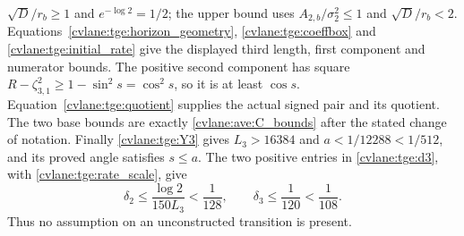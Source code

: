 $\sqrt D/r_b\geq1$ and $e^{-\log2}=1/2$; the upper bound uses
$A_{2,b}/\sigma_2^2\leq1$ and $\sqrt D/r_b<2$.
Equations~\eqref{cvlane:tge:horizon_geometry}, \eqref{cvlane:tge:coeffbox} and
\eqref{cvlane:tge:initial_rate} give the displayed third length, first
component and numerator bounds. The positive second component has
square $R-\zeta_{3,1}^2\geq1-\sin^2s=\cos^2s$, so it is at
least $\cos s$. Equation~\eqref{cvlane:tge:quotient} supplies the actual
signed pair and its quotient. The two base bounds are exactly
\eqref{cvlane:ave:C_bounds} after the stated change of notation.
Finally \eqref{cvlane:tge:Y3} gives $L_3>16384$ and $a<1/12288<1/512$,
and its proved angle satisfies $s\leq a$. The two positive entries
in \eqref{cvlane:tge:d3}, with \eqref{cvlane:tge:rate_scale}, give
\[
 \delta_2\leq\frac{\log2}{150L_3}<\frac1{128},\qquad
 \delta_3\leq\frac1{120}<\frac1{108}.
\]
Thus no assumption on an unconstructed transition is present.

